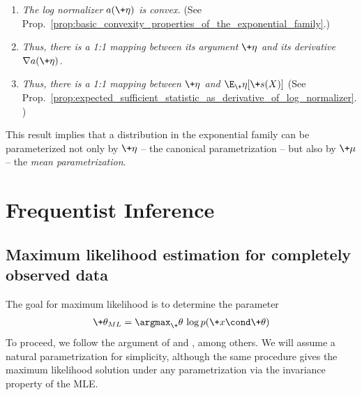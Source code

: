 \documentclass{article} %
\newcommand{\logNormalizerFunction}{a}
\newcommand{\sufficientStatsFunction}{\+s}
\newcommand{\meanParam}{\+\mu}
\newcommand{\param}{\+\theta}
\newcommand{\naturalParam}{\+\eta}
\begin{document}
\begin{enumerate}
\item \textit{The log normalizer $\logNormalizerFunction(\naturalParam)$ is convex.} (See Prop.~\ref{prop:basic_convexity_properties_of_the_exponential_family}.)
\item \textit{Thus, there is a 1:1 mapping	between its argument $\naturalParam$ and its derivative $\nabla \logNormalizerFunction (\naturalParam)$.} 
\item \textit{Thus, there is a 1:1 mapping	between $\naturalParam$ and $\E_\naturalParam[\sufficientStatsFunction(X)]$}  (See Prop.~\ref{prop:expected_sufficient_statistic_as_derivative_of_log_normalizer}.)
\end{enumerate}

 
 This result implies that a distribution in the exponential family can be parameterized not only by $\naturalParam$ -- the canonical parametrization -- but also by $\meanParam$ -- the \textit{mean parametrization}.   



\section{Frequentist Inference}

\subsection{Maximum likelihood estimation for completely observed data}
\label{sec:ml_with_ef}


The goal for maximum likelihood is to determine the parameter
%
\begin{align}
\param_{ML} = \argmax_\param  \, \log p(\+x \cond \param) 
\label{eqn:ml}
\end{align}
%
To proceed, we follow the argument of \citet{dempster1977maximum} and \citet{jordan2010exponential}, among others.   We will assume a natural parametrization for simplicity, although the same procedure gives the maximum likelihood solution under any parametrization via the invariance property of the MLE.
\end{document}
